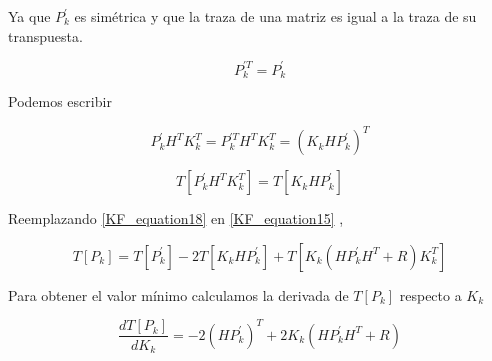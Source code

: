 \documentclass[10pt,a4paper]{article}
\begin{document}
	Ya que $P^\prime_k$ es simétrica  y que la traza de una matriz es igual a la traza de su transpuesta.
	
	\begin{figure}[h!]
		\begin{center}
			\begin{equation}
				P^{\prime T}_k  = P^\prime_k
				\label{KF_equation16}
			\end{equation}	
		\end{center}
	\end{figure}
	
	Podemos escribir
	
	\begin{figure}[h!]
		\begin{center}
			\begin{equation}
				P^\prime_k H^T K^T_k = P^{\prime T}_k H^T K^T_k = (K_k H P^\prime_k )^T
				\label{KF_equation17}
			\end{equation}	
		\end{center}
	\end{figure}
	
	\begin{figure}[h!]
		\begin{center}
			\begin{equation}
				T[P^\prime_k H^T K^T_k] = T[K_k H P^\prime_k]
				\label{KF_equation18}
			\end{equation}	
		\end{center}
	\end{figure}
	
	Reemplazando \ref{KF_equation18} en \ref{KF_equation15} ,
	\begin{figure}[h!]
		\begin{center}
			\begin{equation}
				T[P_k] = T[P^\prime_k] -2 T[K_k H P^\prime_k] + T[K_k (H P^\prime_k H^T + R) K^T_k]
				\label{KF_equation19}
			\end{equation}	
		\end{center}
	\end{figure}
	
	Para obtener el valor mínimo calculamos la derivada de $T[P_k]$ respecto a $K_k$
	
	\begin{figure}[h!]
		\begin{center}
			\begin{equation}
				\frac{dT[P_k]}{dK_k} = -2 (H P^\prime_k)^T + 2K_k (H P^\prime_k H^T + R)
				\label{KF_equation20}
			\end{equation}	
		\end{center}
	\end{figure}
	
\end{document}

